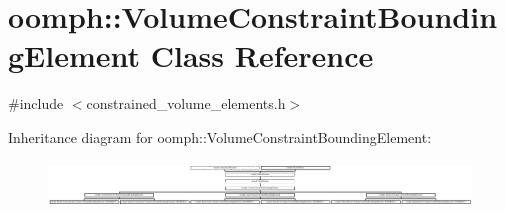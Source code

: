 \hypertarget{classoomph_1_1VolumeConstraintBoundingElement}{}\section{oomph\+:\+:Volume\+Constraint\+Bounding\+Element Class Reference}
\label{classoomph_1_1VolumeConstraintBoundingElement}


{\ttfamily \#include $<$constrained\+\_\+volume\+\_\+elements.\+h$>$}

Inheritance diagram for oomph\+:\+:Volume\+Constraint\+Bounding\+Element\+:\begin{figure}[H]
\begin{center}
\leavevmode
\includegraphics[height=1.238938cm]{classoomph_1_1VolumeConstraintBoundingElement}
\end{center}
\end{figure}
